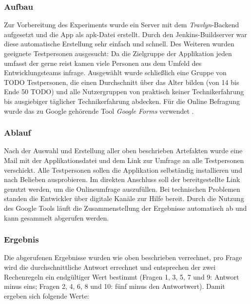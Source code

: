 		\subsubsection{Aufbau}
		Zur Vorbereitung des Experiments wurde ein Server mit dem \textit{Travlyn}-Backend aufgesetzt und die App als apk-Datei erstellt. Durch den Jenkins-Buildserver war diese automatische Erstellung sehr einfach und schnell. Des Weiteren wurden geeignete Testpersonen ausgesucht: Da die Zielgruppe der Applikation jeden umfasst der gerne reist kamen viele Personen aus dem Umfeld des Entwicklungsteams infrage. Ausgewählt wurde schließlich eine Gruppe von TODO Testpersonen, die einen Durchschnitt über das Alter bilden (von 14 bis Ende 50 TODO) und alle Nutzergruppen von praktisch keiner Technikerfahrung bis ausgiebiger täglicher Technikerfahrung abdecken. Für die Online Befragung wurde das zu Google gehörende Tool \textit{Google Forms} verwendet \cite{Google.2020}.
		
		\subsubsection{Ablauf}
		Nach der Auswahl und Erstellung aller oben beschrieben Artefakten wurde eine Mail mit der Applikationsdatei und dem Link zur Umfrage an alle Testpersonen verschickt. Alle Testpersonen sollen die Applikation selbständig installieren und nach Belieben ausprobieren. Im direkten Anschluss soll der bereitgestellte Link genutzt werden, um die Onlineumfrage auszufüllen. Bei technischen Problemen standen die Entwickler über digitale Kanäle zur Hilfe bereit.
		Durch die Nutzung des Google Tools läuft die Zusammenstellung der Ergebnisse automatisch ab und kann gesammelt abgerufen werden.  
		\subsubsection{Ergebnis}
		Die abgerufenen Ergebnisse wurden wie oben beschrieben verrechnet, pro Frage wird die durchschnittliche Antwort errechnet und entsprechen der zwei Rechenregeln ein endgültiger Wert bestimmt (Fragen 1, 3, 5, 7 und 9: Antwort minus eins; Fragen 2, 4, 6, 8 und 10: fünf minus den Antwortwert). Damit ergeben sich folgende Werte:
		
